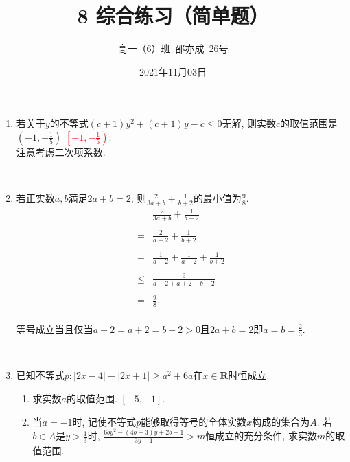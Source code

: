 \documentclass[8pt]{article}
\author{高一（6）班\ 邵亦成\ 26号}
\title{8 综合练习（简单题）}
\date{2021年11月03日}
\begin{document}
	\maketitle

	\begin{enumerate}[label=(\arabic*)]
		\item 若关于$y$的不等式$(c+1)y^2+(c+1)y-c\leq 0$无解, 则实数$c$的取值范围是\st{$\displaystyle \left(-1, -\frac{1}{5}\right)$} \textbf{\textcolor{red}{$\displaystyle \left[-1, -\frac{1}{5}\right)$}}.
			~\\

			注意考虑二次项系数.

		~\\

		\item 若正实数$a, b$满足$2a+b=2$, 则$\displaystyle \frac{2}{3a+b}+\frac{1}{b+2}$的最小值为$\displaystyle \frac{9}{8}$.
			~\\

			$$
			\begin{array}{cl}
				&\displaystyle \frac{2}{3a+b}+\frac{1}{b+2}\\\\
				=&\displaystyle \frac{2}{a+2}+\frac{1}{b+2}\\\\
				=&\displaystyle \frac{1}{a+2}+\frac{1}{a+2}+\frac{1}{b+2}\\\\
				\leq&\displaystyle\frac{9}{a+2+a+2+b+2}\\\\
				=&\displaystyle\frac{9}{8},\\
			\end{array}
			$$

			等号成立当且仅当$a+2=a+2=b+2>0$且$2a+b=2$即$a=b=\displaystyle \frac{2}{3}$.

		~\\

		\item 已知不等式$p: |2x-4|-|2x+1|\geq a^2+6a$在$x\in\mathbf{R}$时恒成立.

		\begin{enumerate}[label=(\arabic*)]
			\item 求实数$a$的取值范围. $[-5, -1].$
			\item 当$a=-1$时, 记使不等式$p$能够取得等号的全体实数$x$构成的集合为$A$. 若$b\in A$是$y>\displaystyle \frac{1}{3}$时, $\displaystyle \frac{6by^2-(4b-3)y+2b-1}{3y-1}>m$恒成立的充分条件, 求实数$m$的取值范围.
				~\\


\end{enumerate}
\end{enumerate}
\end{document}

